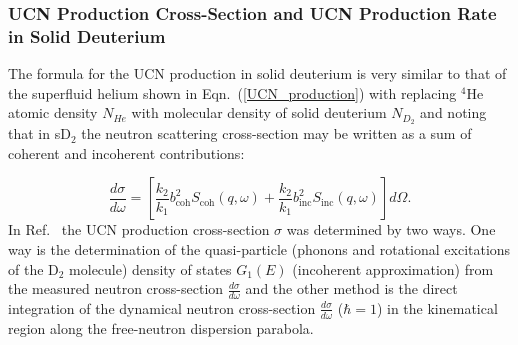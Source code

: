 \subsubsection{UCN Production Cross-Section and UCN Production Rate in Solid Deuterium~\cite{ucnbook,Frei2010,Frei2009}}

The formula for the UCN production in solid deuterium is very similar
to that of the superfluid helium shown in Eqn.~(\ref{UCN_production})
with replacing $^4$He atomic density $N_{He}$ with molecular density
of solid deuterium $N_{D_2}$ and noting that in sD$_2$ the neutron
scattering cross-section may be written as a sum of coherent and
incoherent contributions:

\begin{equation}
\label{eqn:dsigma}
\frac{d\sigma}{d\omega}=\left[ \frac{k_2}{k_1} 
b_{\text{coh}}^2 S_{\text{coh}} (q,\omega) + \frac{k_2}{k_1} b_{\text{inc}}^2 S_{\text{inc}}(q,\omega) \right]
 d\Omega.
\end{equation}
In Ref.~\cite{Frei2010} the UCN production cross-section $\sigma$
was determined by two ways. One way is the determination of the
quasi-particle (phonons and rotational excitations of the D$_2$
molecule) density of states $G_1(E)$ (incoherent approximation) from
the measured neutron cross-section $\frac{d\sigma}{d\omega}$ and the
other method is the direct integration of the dynamical neutron
cross-section $\frac{d\sigma}{d\omega}$ ($\hbar=1$) in the kinematical
region along the free-neutron dispersion parabola.

